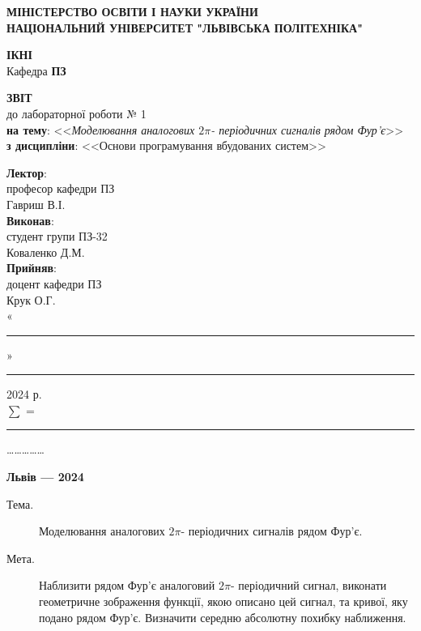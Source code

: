 \documentclass[oneside,14pt]{extarticle}
\newcommand\subject{Основи програмування вбудованих систем}
\newcommand\lecturer{професор кафедри ПЗ\\Гавриш В.І.}
\newcommand\teacher{доцент кафедри ПЗ\\Крук О.Г.}
\newcommand\mygroup{ПЗ-32}
\newcommand\lab{1}
\newcommand\theme{Моделювання аналогових $2\pi$- періодичних сигналів рядом Фур’є}
\newcommand\purpose{Наблизити рядом Фур’є аналоговий $2\pi$- періодичний
	сигнал, виконати геометричне зображення функції, якою описано цей сигнал, та
	кривої, яку подано рядом Фур’є. Визначити середню абсолютну похибку
	наближення}
\begin{document}
\begin{normalsize}
	\begin{titlepage}
		\thispagestyle{empty}
		\begin{center}
			\textbf{МІНІСТЕРСТВО ОСВІТИ І НАУКИ УКРАЇНИ\\
				НАЦІОНАЛЬНИЙ УНІВЕРСИТЕТ "ЛЬВІВСЬКА ПОЛІТЕХНІКА"}
		\end{center}
		\begin{flushright}
			\textbf{ІКНІ}\\
			Кафедра \textbf{ПЗ}
		\end{flushright}
		\vspace{120pt}
		\begin{center}
			\textbf{ЗВІТ}\\
			\vspace{10pt}
			до лабораторної роботи № \lab\\
			\textbf{на тему}: <<\textit{\theme}>>\\
			\textbf{з дисципліни}: <<\subject>>
		\end{center}
		\vspace{40pt}
		\begin{flushright}
			
			\textbf{Лектор}:\\
			\lecturer\\
			\vspace{28pt}
			\textbf{Виконав}:\\
			
			студент групи \mygroup\\
			Коваленко Д.М.\\
			\vspace{28pt}
			\textbf{Прийняв}:\\
			
			\teacher\\
			
			\vspace{28pt}
			«\rule{1cm}{0.15mm}» \rule{1.5cm}{0.15mm} 2024 р.\\
			$\sum$ = \rule{1cm}{0.15mm}……………\\
			
		\end{flushright}
		\vspace{\fill}
		\begin{center}
			\textbf{Львів — 2024}
		\end{center}
	\end{titlepage}
		
	\begin{description}
		\item[Тема.] \theme.
		\item[Мета.] \purpose.
	\end{description}


\end{normalsize}
\end{document}
